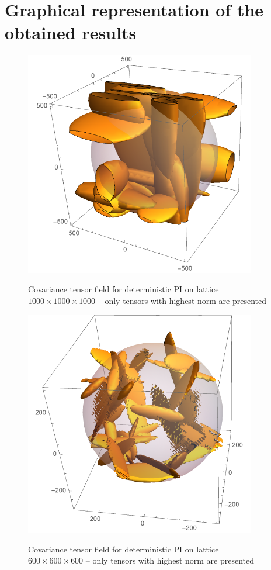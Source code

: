 \section{Graphical representation of the obtained results}

\begin{figure}[H] 
 \centering  \label{tendet}
 \includegraphics[width=0.9\textwidth]{./img/correlation3}
 \caption{Covariance tensor field for deterministic PI on lattice $1000\times 1000\times 1000$ -- only tensors with highest norm are presented}
\end{figure}


\begin{figure}[H] 
 \centering  \label{detcor}
 \includegraphics[width=0.9\textwidth]{./img/detcor}
 \caption{Covariance tensor field for deterministic PI on lattice $600\times 600\times 600$ -- only tensors with highest norm are presented}
\end{figure}

